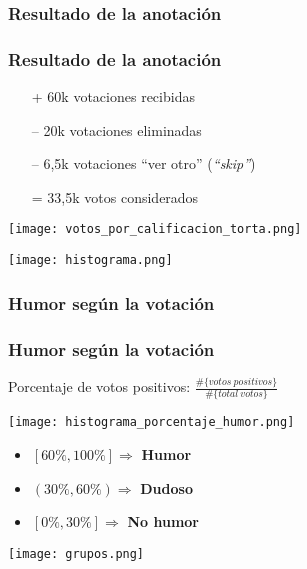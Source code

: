 \subsubsection{Resultado de la anotación}
\begin{frame}[allowframebreaks]
    \frametitle{Resultado de la anotación}

    \begin{itemize}
        \item[+] 60k votaciones recibidas
        \item[--] 20k votaciones eliminadas
        \item[--] 6,5k votaciones “ver otro” (\emph{“skip”})
        \item[=] 33,5k votos considerados
    \end{itemize}

    \framebreak

    \begin{center}
        \texttt{[image: votos\_por\_calificacion\_torta.png]}

        \texttt{[image: histograma.png]}
    \end{center}
\end{frame}

\subsubsection{Humor según la votación}

\begin{frame}[allowframebreaks]
    \frametitle{Humor según la votación}

    Porcentaje de votos positivos: $\frac{\#\{votos\ positivos\}}{\#\{total\ votos\}}$

    \begin{center}
        \texttt{[image: histograma\_porcentaje\_humor.png]}
    \end{center}

    \begin{itemize}
        \item $[60\%, 100\%] \Rightarrow$ \textbf{Humor}
        \item $(30\%, 60\%) \Rightarrow$ \textbf{Dudoso}
        \item $[0\%, 30\%] \Rightarrow$ \textbf{No humor}
    \end{itemize}

    \framebreak

    \begin{center}
        \texttt{[image: grupos.png]}
    \end{center}
\end{frame}

